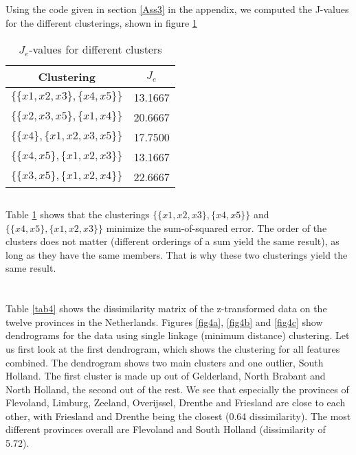 \documentclass[10pt]{article}
\begin{document}
\subsection{}
Using the code given in section \ref{Ass3} in the appendix, we computed the J-values for the different clusterings, shown in figure \ref{tab1}
\begin{table}[H]
	\centering
	\caption{$J_e$-values for different clusters}
	\label{tab1}
	\begin{tabular}{c|c}
		Clustering & $J_e$ \\
		\hline
		$\{\{x1, x2, x3\}, \{x4, x5\}\}$ & 13.1667\\
		$\{\{x2, x3, x5\}, \{x1, x4\}\}$ & 20.6667\\
		$\{\{x4\}, \{x1, x2, x3, x5\}\}$ & 17.7500\\
		$\{\{x4, x5\}, \{x1, x2, x3\}\}$ & 13.1667\\
		$\{\{x3, x5\}, \{x1, x2, x4\}\}$ & 22.6667
	\end{tabular}
\end{table}

\subsection{}
Table \ref{tab1} shows that the clusterings $\{\{x1, x2, x3\}, \{x4, x5\}\}$ and $\{\{x4, x5\}, \{x1, x2, x3\}\}$ minimize the sum-of-squared error. The order of the clusters does not matter (different orderings of a sum yield the same result), as long as they have the same members. That is why these two clusterings yield the same result. 

\section{}
Table \ref{tab4} shows the dissimilarity matrix of the z-transformed data on the twelve provinces in the Netherlands. Figures \ref{fig4a}, \ref{fig4b} and \ref{fig4c} show dendrograms for the data using single linkage (minimum distance) clustering. Let us first look at the first dendrogram, which shows the clustering for all features combined. The dendrogram shows two main clusters and one outlier, South Holland. The first cluster is made up out of Gelderland, North Brabant and North Holland, the second out of the rest. We see that especially the provinces of Flevoland, Limburg, Zeeland, Overijssel, Drenthe and Friesland are close to each other, with Friesland and Drenthe being the closest (0.64 dissimilarity). The most different provinces overall are Flevoland and South Holland (dissimilarity of 5.72).
\end{document}
